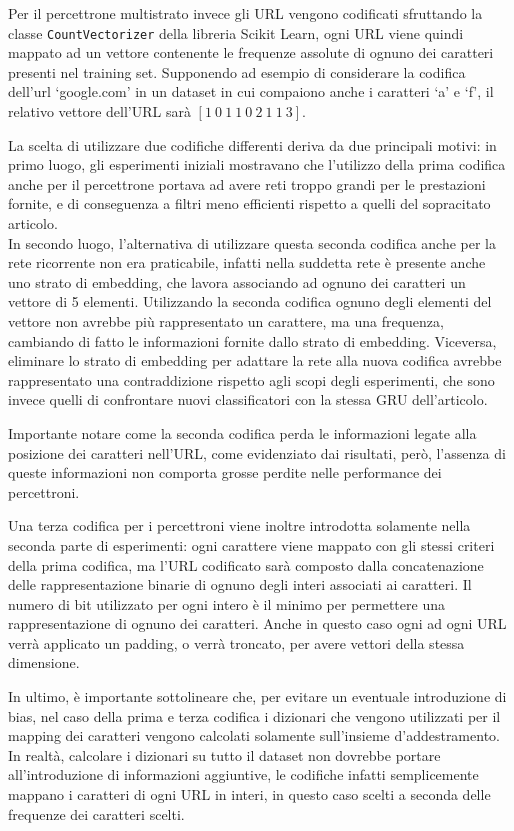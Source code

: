 \documentclass[../../main.tex]{subfiles}
\begin{document}
    Per il percettrone multistrato invece gli URL vengono codificati sfruttando la classe \texttt{CountVectorizer} della libreria Scikit Learn, ogni URL viene quindi mappato ad un vettore contenente le frequenze assolute di ognuno dei caratteri presenti nel training set. Supponendo ad esempio di considerare la codifica dell'url `google.com' in un dataset in cui compaiono anche i caratteri `a' e `f', il relativo vettore dell'URL sarà $[1 \ 0 \ 1 \ 1 \ 0 \ 2 \ 1 \ 1 \ 3]$.

    La scelta di utilizzare due codifiche differenti deriva da due principali motivi: in primo luogo, gli esperimenti iniziali mostravano che l'utilizzo della prima codifica anche per il percettrone portava ad avere reti troppo grandi per le prestazioni fornite, e di conseguenza a filtri meno efficienti rispetto a quelli del sopracitato articolo.\\
    In secondo luogo, l'alternativa di utilizzare questa seconda codifica anche per la rete ricorrente non era praticabile, infatti nella suddetta rete è presente anche uno strato di embedding, che lavora associando ad ognuno dei caratteri un vettore di 5 elementi. Utilizzando la seconda codifica ognuno degli elementi del vettore non avrebbe più rappresentato un carattere, ma una frequenza, cambiando di fatto le informazioni fornite dallo strato di embedding. Viceversa, eliminare lo strato di embedding per adattare la rete alla nuova codifica avrebbe rappresentato una contraddizione rispetto agli scopi degli esperimenti, che sono invece quelli di confrontare nuovi classificatori con la stessa GRU dell'articolo.

    Importante notare come la seconda codifica perda le informazioni legate alla posizione dei caratteri nell'URL, come evidenziato dai risultati, però, l'assenza di queste informazioni non comporta grosse perdite nelle performance dei percettroni.

    Una terza codifica per i percettroni viene inoltre introdotta solamente nella seconda parte di esperimenti: ogni carattere viene mappato con gli stessi criteri della prima codifica, ma l'URL codificato sarà composto dalla concatenazione delle rappresentazione binarie di ognuno degli interi associati ai caratteri. Il numero di bit utilizzato per ogni intero è il minimo per permettere una rappresentazione di ognuno dei caratteri. Anche in questo caso ogni ad ogni URL verrà applicato un padding, o verrà troncato, per avere vettori della stessa dimensione.

    In ultimo, è importante sottolineare che, per evitare un eventuale introduzione di bias, nel caso della prima e terza codifica i dizionari che vengono utilizzati per il mapping dei caratteri vengono calcolati solamente sull'insieme d'addestramento. In realtà, calcolare i dizionari su tutto il dataset non dovrebbe portare all'introduzione di informazioni aggiuntive, le codifiche infatti semplicemente mappano i caratteri di ogni URL in interi, in questo caso scelti a seconda delle frequenze dei caratteri scelti.
\end{document}
